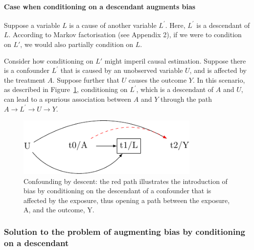 \documentclass[
  singlecolumn,
  9pt]{article}
\let\oldparagraph\paragraph
\renewcommand{\paragraph}[1]{\oldparagraph{#1}\mbox{}}
\begin{document}
\paragraph{Case when conditioning on a descendant augments
bias}\label{case-when-conditioning-on-a-descendant-augments-bias}

Suppose a variable \(L\) is a cause of another variable \(L^\prime\).
Here, \(L^\prime\) is a descendant of \(L\). According to Markov
factorisation (see Appendix 2), if we were to condition on \(L\prime\),
we would also partially condition on \(L\).

Consider how conditioning on \(L\prime\) might imperil causal
estimation. Suppose there is a confounder \(L^\prime\) that is caused by
an unobserved variable \(U\), and is affected by the treatment \(A\).
Suppose further that \(U\) causes the outcome \(Y\). In this scenario,
as described in Figure~\ref{fig-dag-descendent}, conditioning on
\(L^\prime\), which is a descendant of \(A\) and \(U\), can lead to a
spurious association between \(A\) and \(Y\) through the path
\(A \to L^\prime \to U \to Y\).

\begin{figure}

{\centering \includegraphics[width=0.8\textwidth,height=\textheight]{causal-dags_files/figure-pdf/fig-dag-descendent-1.pdf}

}

\caption{\label{fig-dag-descendent}Confounding by descent: the red path
illustrates the introduction of bias by conditioning on the descendant
of a confounder that is affected by the exposure, thus opening a path
between the exposure, A, and the outcome, Y.}

\end{figure}

\subsubsection{Solution to the problem of augmenting bias by
conditioning on a
descendant}\label{solution-to-the-problem-of-augmenting-bias-by-conditioning-on-a-descendant}
\end{document}
